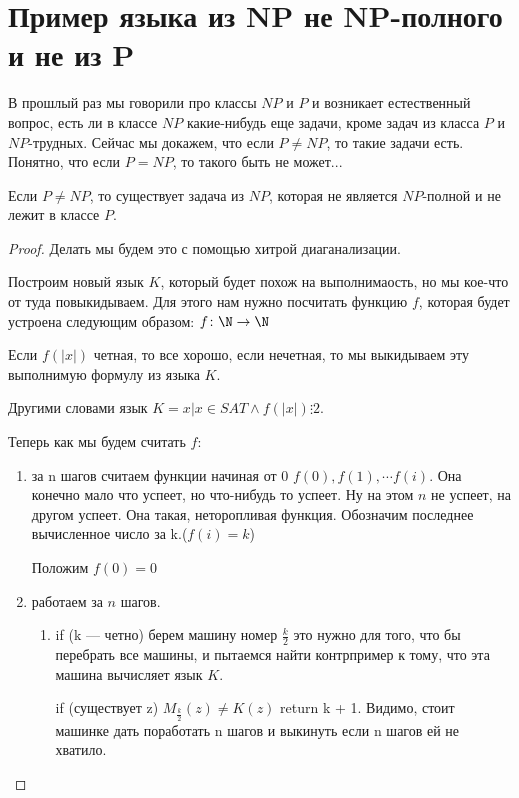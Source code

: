 ﻿\section{Пример языка из NP не NP-полного и не из P}
В прошлый раз мы говорили про классы $NP$ и $P$ и возникает естественный вопрос, есть ли в классе 
$NP$ какие-нибудь еще задачи, кроме задач из класса $P$ и $NP$-трудных. Сейчас мы докажем, 
что если $P \ne NP$, то такие задачи есть. Понятно, что если $P = NP$, то такого быть не может...

\begin{theorem}
	Если $P \ne NP$, то существует задача из $NP$, которая не 
	является $NP$-полной и не лежит в классе $P$.
\end{theorem}

\begin{proof}
	Делать мы будем это с помощью хитрой диаганализации.

	Построим новый язык $K$, который будет похож на выполнимаость, но мы кое-что от туда повыкидываем. 
	Для этого нам нужно посчитать функцию $f$, которая будет устроена следующим образом:
	$f \colon \N \to \N$  

	Если $f(|x|)$ четная, то все хорошо, если нечетная, то мы выкидываем эту выполнимую формулу из языка $K$.

	Другими словами язык $K = {x | x \in SAT \wedge f(|x|) \vdots 2}$.

	Теперь как мы будем считать $f$:
	\begin{enumerate}
    	\item за n шагов считаем функции начиная от 0 $f(0), f(1), \cdots f(i)$. 
    	Она конечно мало что успеет, но что-нибудь то успеет. Ну на этом $n$ не 
    	успеет, на другом успеет. Она такая, неторопливая функция. Обозначим 
    	последнее вычисленное число за k.($f(i) = k$)
    
    	Положим $f(0) = 0$\\
    	\item работаем за $n$ шагов. 
    	\begin{enumerate}
    		\item if (k --- четно) берем машину номер $\frac{k}{2}$ это нужно для 
    		того, что бы перебрать все машины, и пытаемся найти контрпример к тому, 
    		что эта машина вычисляет язык $K$. 
    		
    		if (существует z) $M_{\frac{k}{2}}(z) \ne K(z)$  return k + 1. 
    		Видимо, стоит машинке дать поработать n шагов и выкинуть если n шагов ей не хватило. 



\end{enumerate}
\end{enumerate}
\end{proof}
